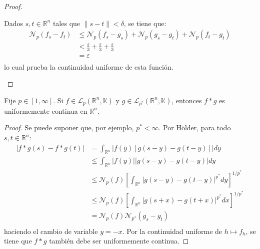 \documentclass[12pt]{report}
\theoremstyle{largebreak}
\newcommand\abs[1]{\ensuremath{\big|#1\big|}}
\newcommand\norm[1]{\ensuremath{\|#1\|}}
\newcommand{\N}[2]{\ensuremath{\mathcal{N}_{#1}\left(#2\right)}}
\begin{document}
\begin{proof}
\begin{enumerate}
\begin{equation*}
            \end{equation*}
            Dados $s,t\in\mathbb{R}^n$ tales que $\norm{s-t}<\delta$, se tiene que:
            \begin{equation*}
                \begin{split}
                    \N{p}{f_s-f_t}&\leq\N{p}{f_s-g_s}+\N{p}{g_s-g_t}+\N{p}{f_t-g_t}\\
                    &<\frac{\varepsilon}{3}+\frac{\varepsilon}{3}+\frac{\varepsilon}{3}\\
                    &=\varepsilon\\
                \end{split}
            \end{equation*}
            lo cual prueba la continuidad uniforme de esta función.
        \end{enumerate}
    \end{proof}

    \begin{propo}
        Fije $p\in[1,\infty]$. Si $f\in\mathcal{L}_p(\mathbb{R}^n,\mathbb{K})$ y $g\in\mathcal{L}_{ p^*}(\mathbb{R}^n,\mathbb{K})$, entonces $f*g$ es uniformemente continua en $\mathbb{R}^n$.
    \end{propo}

    \begin{proof}
        Se puede suponer que, por ejemplo, $p^*<\infty$. Por Hölder, para todo $s,t\in\mathbb{R}^n$:
        \begin{equation*}
            \begin{split}
                \abs{f*g(s)-f*g(t)}&=\int_{\mathbb{R}^n}\abs{f(y)[g(s-y)-g(t-y)]}dy\\
                &\leq\int_{\mathbb{R}^n}\abs{f(y)}\abs{g(s-y)-g(t-y)}dy\\
                &\leq\N{p}{f}\left[\int_{\mathbb{R}^n}\abs{g(s-y)-g(t-y)}^{ p^*}dy \right]^{1/p^*}\\
                &\leq\N{p}{f}\left[\int_{\mathbb{R}^n}\abs{g(s+x)-g(t+x)}^{ p^*}dx \right]^{1/p^*}\\
                &=\N{p}{f}\N{p^*}{g_s-g_t}\\
            \end{split}
        \end{equation*}
        haciendo el cambio de variable $y=-x$. Por la continuidad uniforme de $h\mapsto f_h$, se tiene que $f*g$ también debe ser uniformemente continua.
    \end{proof}
\end{document}
